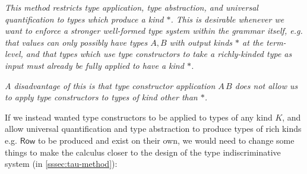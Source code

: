 \documentclass[acmsmall, 9pt]{article}
\begin{document}
\textit{This method restricts type application, type abstraction, and universal quantification to types which produce a kind $*$. This is desirable whenever we want to enforce a stronger well-formed type system within the grammar itself, e.g. that values can only possibly have types $A, B$ with output kinds $*$ at the term-level, and that types which use type constructors to take a richly-kinded type as input must already be fully applied to have a kind $*$.}

\textit{A disadvantage of this is that type constructor application $A\,B$ does not allow us to apply type constructors to types of kind other than $*$.}\vspace{0.3cm}

\noindent
If we instead wanted type constructors to be applied to types of any kind $K$, and allow universal quantification and type abstraction to produce types of rich kinds e.g. $\mathsf{Row}$ to be produced and exist on their own, we would need to change some things to make the calculus closer to the design of the type indiscriminative system (in \ref{sssec:tau-method}):
\end{document}
